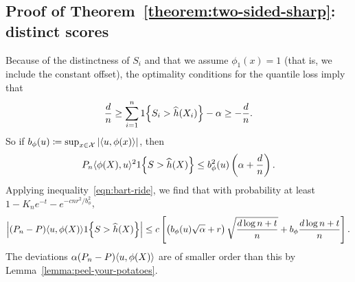 \documentclass{article}
\newcommand{\radphi}{b_{\phi}}
\newcommand{\scorerv}{S}
\begin{document}
\subsection{Proof of Theorem~\ref{theorem:two-sided-sharp}: distinct scores}
\label{sec:proof-two-sided-sharp}

Because of the distinctness of
$\scorerv_i$ and that we assume $\phi_1(x) = 1$ (that is, we include
the constant offset), the optimality conditions for
the quantile loss imply that
\begin{equation*}
  \frac{d}{n} \ge \sum_{i = 1}^n \indic{\scorerv_i > \what{h}(X_i)}
  - \alpha \ge -\frac{d}{n}.
\end{equation*}
So if $\radphi(u) \defeq \sup_{x \in \mc{X}} |\<u, \phi(x)\>|$, then
\begin{equation*}
  P_n\<\phi(X), u\>^2 \indic{\scorerv > \what{h}(X)}
  \le \radphi^2(u) \left(\alpha  + \frac{d}{n} \right).
\end{equation*}
Applying inequality~\eqref{eqn:bart-ride},
we find that with probability at least $1 - K_n e^{-t} - e^{-c n r^2 /
  \radphi^2}$,
\begin{equation*}
  \left|(P_n - P)\<u, \phi(X)\> \indic{\scorerv > \what{h}(X)}\right|
  \le c \left[\left(\radphi(u)\sqrt{\alpha}
    + r\right)\sqrt{\frac{d \log n + t}{n}}
    + \radphi  \frac{d \log n + t}{n}\right].
\end{equation*}
The deviations $\alpha (P_n - P)\langle u, \phi(X)\rangle$ are of smaller
order than this by Lemma~\ref{lemma:peel-your-potatoes}.


\end{document}
